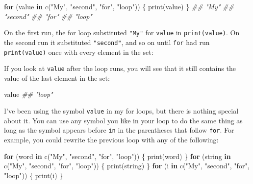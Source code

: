 \documentclass[
  letterpaper,
  DIV=11,
  numbers=noendperiod]{scrbook}
\newenvironment{Shaded}{\begin{snugshade}}{\end{snugshade}}
\newcommand{\ControlFlowTok}[1]{\textcolor[rgb]{0.00,0.23,0.31}{\textbf{#1}}}
\newcommand{\DocumentationTok}[1]{\textcolor[rgb]{0.37,0.37,0.37}{\textit{#1}}}
\newcommand{\FunctionTok}[1]{\textcolor[rgb]{0.28,0.35,0.67}{#1}}
\newcommand{\NormalTok}[1]{\textcolor[rgb]{0.00,0.23,0.31}{#1}}
\newcommand{\StringTok}[1]{\textcolor[rgb]{0.13,0.47,0.30}{#1}}
\begin{document}
\begin{Shaded}
\begin{Highlighting}[]
\ControlFlowTok{for}\NormalTok{ (value }\ControlFlowTok{in} \FunctionTok{c}\NormalTok{(}\StringTok{"My"}\NormalTok{, }\StringTok{"second"}\NormalTok{, }\StringTok{"for"}\NormalTok{, }\StringTok{"loop"}\NormalTok{)) \{}
  \FunctionTok{print}\NormalTok{(value)}
\NormalTok{\}}
\DocumentationTok{\#\# "My"}
\DocumentationTok{\#\# "second"}
\DocumentationTok{\#\# "for"}
\DocumentationTok{\#\# "loop"}
\end{Highlighting}
\end{Shaded}

On the first run, the for loop substituted \texttt{"My"} for
\texttt{value} in \texttt{print(value)}. On the second run it
substituted \texttt{"second"}, and so on until \texttt{for} had run
\texttt{print(value)} once with every element in the set:

If you look at \texttt{value} after the loop runs, you will see that it
still contains the value of the last element in the set:

\begin{Shaded}
\begin{Highlighting}[]
\NormalTok{value}
\DocumentationTok{\#\# "loop"}
\end{Highlighting}
\end{Shaded}

I've been using the symbol \texttt{value} in my for loops, but there is
nothing special about it. You can use any symbol you like in your loop
to do the same thing as long as the symbol appears before \texttt{in} in
the parentheses that follow \texttt{for}. For example, you could rewrite
the previous loop with any of the following:

\begin{Shaded}
\begin{Highlighting}[]
\ControlFlowTok{for}\NormalTok{ (word }\ControlFlowTok{in} \FunctionTok{c}\NormalTok{(}\StringTok{"My"}\NormalTok{, }\StringTok{"second"}\NormalTok{, }\StringTok{"for"}\NormalTok{, }\StringTok{"loop"}\NormalTok{)) \{}
  \FunctionTok{print}\NormalTok{(word)}
\NormalTok{\}}
\ControlFlowTok{for}\NormalTok{ (string }\ControlFlowTok{in} \FunctionTok{c}\NormalTok{(}\StringTok{"My"}\NormalTok{, }\StringTok{"second"}\NormalTok{, }\StringTok{"for"}\NormalTok{, }\StringTok{"loop"}\NormalTok{)) \{}
  \FunctionTok{print}\NormalTok{(string)}
\NormalTok{\}}
\ControlFlowTok{for}\NormalTok{ (i }\ControlFlowTok{in} \FunctionTok{c}\NormalTok{(}\StringTok{"My"}\NormalTok{, }\StringTok{"second"}\NormalTok{, }\StringTok{"for"}\NormalTok{, }\StringTok{"loop"}\NormalTok{)) \{}
  \FunctionTok{print}\NormalTok{(i)}
\NormalTok{\}}
\end{Highlighting}
\end{Shaded}
\end{document}
